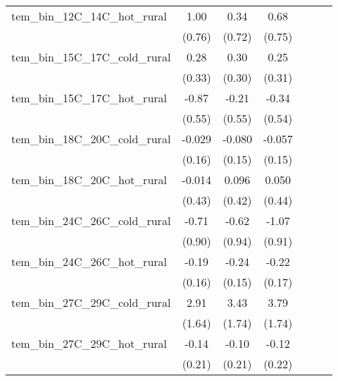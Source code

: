 \documentclass[paper=letterpaper, fontsize=11pt]{article} %
\begin{document}
\begin{longtable}{l*{6}{c}}
tem\_bin\_12C\_14C\_hot\_rural&        1.00&        0.34&        0.68&            &            &            \\
                    &      (0.76)&      (0.72)&      (0.75)&            &            &            \\
tem\_bin\_15C\_17C\_cold\_rural&        0.28&        0.30&        0.25&            &            &            \\
                    &      (0.33)&      (0.30)&      (0.31)&            &            &            \\
tem\_bin\_15C\_17C\_hot\_rural&       -0.87&       -0.21&       -0.34&            &            &            \\
                    &      (0.55)&      (0.55)&      (0.54)&            &            &            \\
tem\_bin\_18C\_20C\_cold\_rural&      -0.029&      -0.080&      -0.057&            &            &            \\
                    &      (0.16)&      (0.15)&      (0.15)&            &            &            \\
tem\_bin\_18C\_20C\_hot\_rural&      -0.014&       0.096&       0.050&            &            &            \\
                    &      (0.43)&      (0.42)&      (0.44)&            &            &            \\
tem\_bin\_24C\_26C\_cold\_rural&       -0.71&       -0.62&       -1.07&            &            &            \\
                    &      (0.90)&      (0.94)&      (0.91)&            &            &            \\
tem\_bin\_24C\_26C\_hot\_rural&       -0.19&       -0.24&       -0.22&            &            &            \\
                    &      (0.16)&      (0.15)&      (0.17)&            &            &            \\
tem\_bin\_27C\_29C\_cold\_rural&        2.91&        3.43&        3.79&            &            &            \\
                    &      (1.64)&      (1.74)&      (1.74)&            &            &            \\
tem\_bin\_27C\_29C\_hot\_rural&       -0.14&       -0.10&       -0.12&            &            &            \\
                    &      (0.21)&      (0.21)&      (0.22)&            &            &            \\

\end{longtable}
\end{document}
